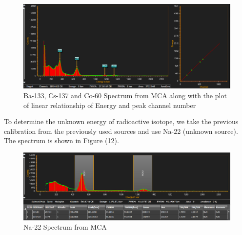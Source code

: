 \documentclass[a4paper, amsfonts, amssymb, amsmath, reprint, showkeys, nofootinbib, twoside]{revtex4-1}
\begin{document}
\begin{figure}[h]
	\centering
	\includegraphics[width=\textwidth, height=\columnwidth,angle=90]{th}
	\caption{Ba-133, Cs-137 and Co-60 Spectrum from MCA along with the plot of linear relationship of Energy and peak channel number}
\end{figure}

To determine the unknown energy of radioactive isotope, we take the previous calibration from the previously used sources and use Na-22 (unknown source). The spectrum is shown in Figure (12).

\begin{figure}[h]
	\centering
	\includegraphics[width=\textheight,height=\columnwidth,angle=90]{Na}
	\caption{Na-22 Spectrum from MCA }
\end{figure}
\end{document}
